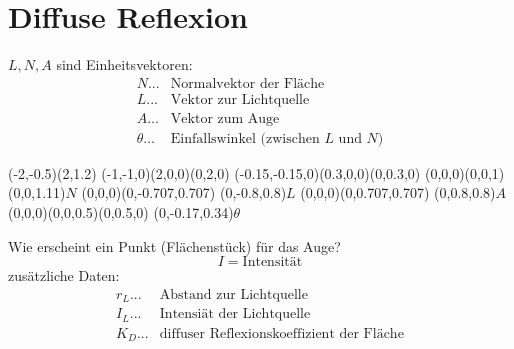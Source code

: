 \section{Diffuse Reflexion}\label{sec:diffuse_refl}
	$L, N, A$ sind Einheitsvektoren:
	\begin{align*}
	 N... &\text{Normalvektor der Fläche}\\
	 L... &\text{Vektor zur Lichtquelle}\\
	 A... &\text{Vektor zum Auge}\\
	 \theta... &\text{Einfallswinkel (zwischen $L$ und $N$)}
	\end{align*}
	\begin{center}
	 \begin{pspicture}(-2,-0.5)(2,1.2)
	  \pstThreeDSquare(-1,-1,0)(2,0,0)(0,2,0)
	  \pstThreeDSquare(-0.15,-0.15,0)(0.3,0,0)(0,0.3,0)
	  \pstThreeDLine{->}(0,0,0)(0,0,1)
	  \pstThreeDPut(0,0,1.11){$N$}
	  \pstThreeDLine{->}(0,0,0)(0,-0.707,0.707)
	  \pstThreeDPut(0,-0.8,0.8){$L$}
	  \pstThreeDLine{->}(0,0,0)(0,0.707,0.707)
	  \pstThreeDPut(0,0.8,0.8){$A$}
	  \pstThreeDCircle[beginAngle=0,endAngle=-45,arrows=<->](0,0,0)(0,0,0.5)(0,0.5,0)
	  \pstThreeDPut(0,-0.17,0.34){$\theta$}
	 \end{pspicture}
	\end{center}
	Wie erscheint ein Punkt (Flächenstück) für das Auge?
	\[I = \text{Intensität}\]
	zusätzliche Daten:
	\begin{align*}
	 r_L... &\text{Abstand zur Lichtquelle}\\
	 I_L... &\text{Intensiät der Lichtquelle}\\
	 K_D... &\text{diffuser Reflexionskoeffizient der Fläche}
	\end{align*}
